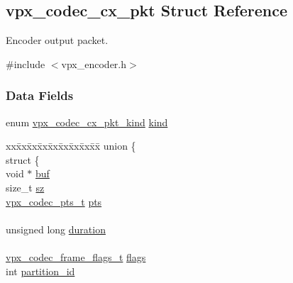 \hypertarget{structvpx__codec__cx__pkt}{}\subsection{vpx\+\_\+codec\+\_\+cx\+\_\+pkt Struct Reference}
\label{structvpx__codec__cx__pkt}


Encoder output packet.  




{\ttfamily \#include $<$vpx\+\_\+encoder.\+h$>$}

\subsubsection*{Data Fields}
\begin{DoxyCompactItemize}
\item 
enum \hyperlink{group__encoder_ga28a79375279536526552af3a83d2ed72}{vpx\+\_\+codec\+\_\+cx\+\_\+pkt\+\_\+kind} \hyperlink{structvpx__codec__cx__pkt_a41f395b39516343c1329a4a85a0084f2}{kind}
\item 
\begin{tabbing}
xx\=xx\=xx\=xx\=xx\=xx\=xx\=xx\=xx\=\kill
union \{\\
\>struct \{\\
\>\>void $\ast$ \hyperlink{structvpx__codec__cx__pkt_a9e1db068593b6037e70b05b5239784d2}{buf}\\
\>\>size\_t \hyperlink{structvpx__codec__cx__pkt_a857321ba2dc65e81c430d14c36a542d9}{sz}\\
\>\>\hyperlink{group__encoder_ga7e711b0a71c65aef8f0faea8bd57b05f}{vpx\_codec\_pts\_t} \hyperlink{structvpx__codec__cx__pkt_aa75fe039fe6b47fb25d20684864bef12}{pts}\\
\>\>\\
\>\>unsigned long \hyperlink{structvpx__codec__cx__pkt_afb8d9069980e759d97d2eb9fae7e5e06}{duration}\\
\>\>\\
\>\>\hyperlink{group__encoder_gaac8ee319b9a6175f6946f59437c7ae4b}{vpx\_codec\_frame\_flags\_t} \hyperlink{structvpx__codec__cx__pkt_a3876fe0306342611465e9c15c6c4ae2f}{flags}\\
\>\>int \hyperlink{structvpx__codec__cx__pkt_aaffee6af93af238ca7a145fb56c6d6f7}{partition\_id}\\
\>\>\\

\end{tabbing}
\end{DoxyCompactItemize}

